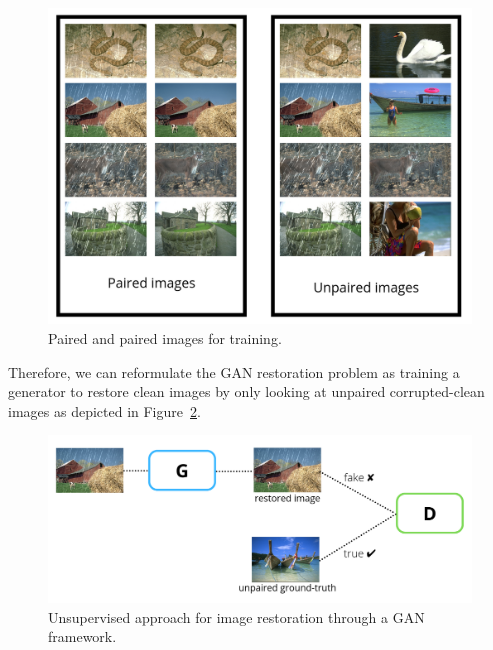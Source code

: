 \begin{figure}[h]
    \label{fig: pairs}
    \centering
    \includegraphics[scale=0.2]{./figures/pairs.png}
    \caption{Paired and paired images for training.}
\end{figure}
\par Therefore, we can reformulate the GAN restoration problem as training a generator to restore clean images by only looking at unpaired corrupted-clean images as depicted in Figure~\ref{fig: unsup_GAN}.
\begin{figure}[h]
    \label{fig: unsup_GAN}
    \centering
    \includegraphics[scale=0.25]{./figures/unsup_GAN.png}
    \caption{Unsupervised approach for image restoration through a GAN framework.}
\end{figure}
